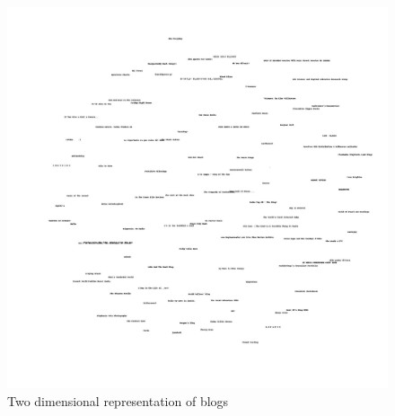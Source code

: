 \documentclass[letterpaper,11pt]{article}
\begin{document}
 \begin{figure}[h]
 \centering
 \includegraphics[scale=0.2]{q4Mds}
 \caption{Two dimensional representation of blogs}
 \label{fig:mds}
 \end{figure}
\end{document}

